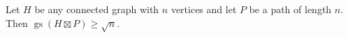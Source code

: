 \documentclass{patmorin}
\newcommand{\defin}[1]{\textcolor{Maroon}{\emph{#1}}}
\DeclareMathOperator{\tw}{tw}
\DeclareMathOperator{\gm}{gm}
\DeclareMathOperator{\gs}{gs}
\begin{document}
\begin{cor}\label{graph_times_path}
  Let $H$ be any connected graph with $n$ vertices and let $P$ be a path of length $n$.  Then $\gs(H\boxtimes P)\ge \sqrt{n}$.
\end{cor}

%
%
%
%
%
\end{document}
